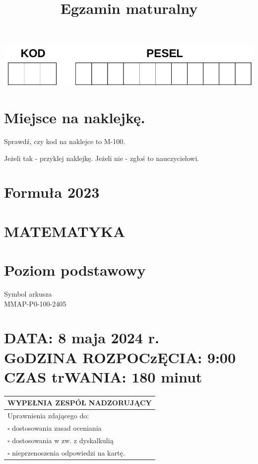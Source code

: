 \documentclass[10pt]{article}
\title{Egzamin maturalny }
\author{}
\date{}
\begin{document}
\maketitle
\begin{center}
\includegraphics[max width=\textwidth]{2024_11_21_daeb5e5efb43dd4cb535g-01}
\end{center}

\section*{Miejsce na naklejkę.}
Sprawdź, czy kod na naklejce to M-100.

Jeżeli tak - przyklej naklejkę. Jeżeli nie - zgłoś to nauczycielowi.

\section*{Formuła 2023}
\section*{MATEMATYKA}
\section*{Poziom podstawowy}
Symbol arkusza\\
MMAP-P0-100-2405

\section*{DATA: 8 maja 2024 r. \\
 GoDZINA ROZPOCzĘCIA: 9:00 \\
 CZAS trWANIA: \(\mathbf{1 8 0}\) minut}
\begin{center}
\begin{tabular}{|l|}
\hline
WYPEŁNIA ZESPÓŁ NADZORUJĄCY \\
\hline
Uprawnienia zdającego do: \\
\(\square\) dostosowania zasad oceniania \\
\(\square\) dostosowania w zw. z dyskalkulią \\
\(\square\) nieprzenoszenia odpowiedzi na kartę. \\
\hline
\end{tabular}
\end{center}
\end{document}

